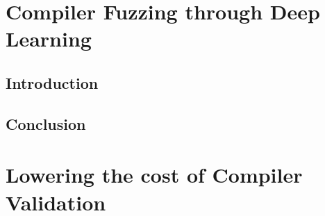\ifstapled
\chapter{Compiler Fuzzing through Deep Learning}
\section{Introduction}
\lipsum[1-2]

\section{Conclusion}
\lipsum[1-2]
\else
\chapter{Lowering the cost of Compiler Validation}
\label{chap:deepsmith}






\fi
